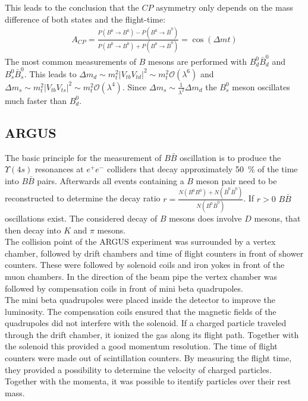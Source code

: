 This leads to the conclusion that the $CP$ asymmetry only depends on the mass difference of both states and the flight-time:
\begin{align*}
	A_{CP} = \frac{P(B^0\rightarrow B^0) - P(B^0\rightarrow \bar{B}^0)}{P(B^0\rightarrow B^0) + P(B^0\rightarrow \bar{B}^0)} = \cos(\Delta m t)
\end{align*}
The most common measurements of $B$ mesons are performed with $B_d^0\bar{B}_d^0$ and $B_s^0\bar{B}_s^0$. This leads to $\Delta m_d \sim m_t^2|V_{tb}V_{td}|^2 \sim m_t^2 \mathcal{O}(\lambda^6)$ and $\Delta m_s \sim m_t^2|V_{tb}V_{ts}|^2 \sim m_t^2 \mathcal{O}(\lambda^4)$.
Since $\Delta m_s \sim \frac{1}{\lambda^2} \Delta m_d$ the $B_s^0$ meson oscillates much faster than $B_d^0$.
\subsection{ARGUS}
The basic principle for the measurement of $B\bar{B}$ oscillation is to produce the $\Upsilon(4s)$ resonances at $e^+e^-$ colliders that decay approximately \SI{50}{\percent} of the time into $B\bar{B}$ pairs. Afterwards all events containing a $B$ meson pair need to be reconstructed to determine the decay ratio $r = \frac{N(B^0B^0)+ N(\bar{B}^0\bar{B}^0)}{N(B^0\bar{B}^0)}$. If $r>0$ $B\bar{B}$ oscillations exist. The considered decay of $B$ mesons does involve $D$ mesons, that then decay into $K$ and $\pi$ mesons.\\
The collision point of the ARGUS experiment was surrounded by a vertex chamber, followed by drift chambers and time of flight counters in front of shower counters. These were followed by solenoid coils and iron yokes in front of the muon chambers. In the direction of the beam pipe the vertex chamber was followed by compensation coils in front of mini beta quadrupoles. \\
The mini beta quadrupoles were placed inside the detector to improve the luminosity. The compensation coils ensured that the magnetic fields of the quadrupoles did not interfere with the solenoid. If a charged particle traveled through the drift chamber, it ionized the gas along its flight path. Together with the solenoid this provided a good momentum resolution. The time of flight counters were made out of scintillation counters. By measuring the flight time, they provided a possibility to determine the velocity of charged particles. Together with the momenta, it was possible to itentify particles over their rest mass.
